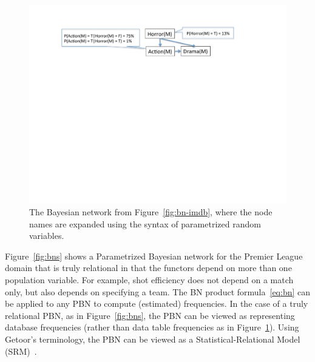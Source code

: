 {{\begin{figure}[t]
 		\centering
 		\includegraphics[width=1\textwidth] 
 		{movie-bn2.pdf}
 		\caption[Example of conditional and marginal probabilities computed from a toy Bayesian network structure. ]{The Bayesian network from Figure~\ref{fig:bn-imdb}, where the node names are expanded using the syntax of parametrized random variables.
 			\label{fig:bn-imdb2}
 		}
 	\end{figure}


Figure~\ref{fig:bns} shows a Parametrized Bayesian network for the Premier League domain that is truly relational in that the functors depend on more than one population variable. For example, shot efficiency does not depend on a match only, but also depends on specifying a team. The BN product formula~\eqref{eq:bn} can be applied to any PBN to compute (estimated) frequencies. In the case of a truly relational PBN, as in Figure~\ref{fig:bns}, the PBN can be viewed as representing database frequencies (rather than data table frequencies as in Figure~\ref{fig:bn-imdb2}). Using Getoor's terminology, the PBN can be viewed as a Statistical-Relational Model (SRM)~\cite{Getoor2001a,Schulte2014,Schulte2017a}.


}}
